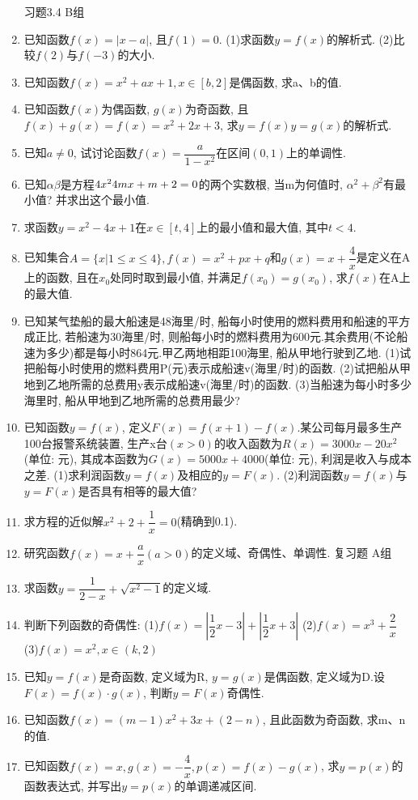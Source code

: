 \documentclass[10pt,a4paper]{article}
\begin{document}
\begin{enumerate}[1.]
习题3.4  B组
\item 已知函数$f(x)=|x-a|$, 且$f(1)=0$.
(1)求函数$y=f(x)$的解析式.
(2)比较$f(2)$与$f(-3)$的大小.
\item 已知函数$f(x)=x^2+ax+1,x\in [b,2]$是偶函数, 求a、b的值.
\item 已知函数$f(x)$为偶函数, $g(x)$为奇函数, 且$f(x)+g(x)=f(x)=x^2+2x+3$, 求$y=f(x)y=g(x)$的解析式.
\item 已知$a\ne 0$, 试讨论函数$f(x)=\dfrac a{1-x^2}$在区间$(0,1)$上的单调性.
\item 已知$\alpha \beta$是方程$\text4x^24mx+m+2=0$的两个实数根, 当m为何值时, $\alpha ^2+\beta ^2$有最小值? 并求出这个最小值.
\item 求函数$y=x^2-4x+1$在$x\in [t,4]$上的最小值和最大值, 其中$t<4$.
\item 已知集合$A=\{x|1\le x\le 4\},f(x)=x^2+px+q$和$g(x)=x+\dfrac 4x$是定义在A上的函数, 且在$x_0$处同时取到最小值, 并满足$f(x_0)=g(x_0)$, 求$f(x)$在A上的最大值.
\item 已知某气垫船的最大船速是48海里/时, 船每小时使用的燃料费用和船速的平方成正比, 若船速为30海里/时, 则船每小时的燃料费用为600元.其余费用(不论船速为多少)都是每小时864元.甲乙两地相距100海里, 船从甲地行驶到乙地.
(1)试把船每小时使用的燃料费用P(元)表示成船速v(海里/时)的函数.
(2)试把船从甲地到乙地所需的总费用y表示成船速v(海里/时)的函数.
(3)当船速为每小时多少海里时, 船从甲地到乙地所需的总费用最少?
\item 已知函数$y=f(x)$, 定义$F(x)=f(x+1)-f(x)$.某公司每月最多生产 100台报警系统装置, 生产x台$(x>0)$的收入函数为$R(x)=3000x-20x^2$(单位: 元), 其成本函数为$G(x)=5000x+4000$(单位: 元), 利润是收入与成本之差.
(1)求利润函数$y=f(x)$及相应的$y=F(x)$.
(2)利润函数$y=f(x)$与$y=F(x)$是否具有相等的最大值?
\item 求方程的近似解$x^2+2+\dfrac 1x=0$(精确到0.1).
\item 研究函数$f(x)=x+\dfrac ax(a>0)$的定义域、奇偶性、单调性.
复习题
A组
\item 求函数$y=\dfrac 1{2-x}+\sqrt {x^2-1}$的定义域.
\item 判断下列函数的奇偶性:
(1)$f(x)=|\dfrac 12x-3|+|\dfrac 12x+3|$				(2)$f(x)=x^3+\dfrac 2x$
(3)$f(x)=x^2,x\in (k,2)$
\item 已知$y=f(x)$是奇函数, 定义域为R, $y=g(x)$是偶函数, 定义域为D.设$F(x)=f(x)\cdot g(x)$, 判断$y=F(x)$奇偶性.
\item 已知函数$f(x)=(m-1)x^2+3x+(2-n)$, 且此函数为奇函数, 求m、n的值.
\item 已知函数$f(x)=x,g(x)=-\dfrac 4x,p(x)=f(x)-g(x)$, 求$y=p(x)$的函数表达式, 并写出$y=p(x)$的单调递减区间.

\end{enumerate}
\end{document}
